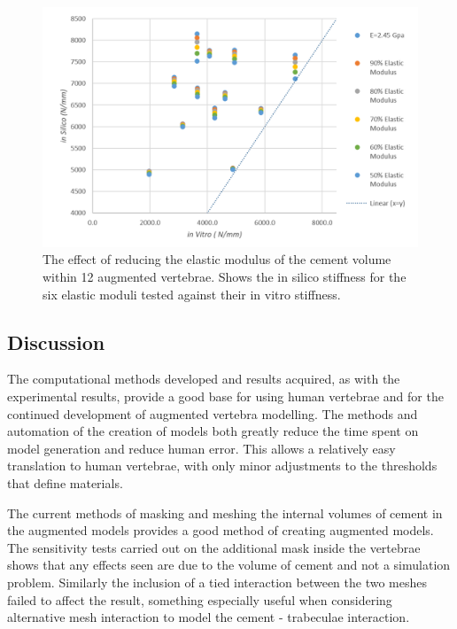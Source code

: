 \begin{figure}[ht!]
\centering
\includegraphics[width=5.3in]{images/reductionOfEMod_Scatter.png}
\caption{The effect of reducing the elastic modulus of the cement volume within 12 augmented vertebrae. Shows the in silico stiffness for the six elastic moduli tested against their in vitro stiffness. }
\label{fig:redEModscatter}
\end{figure}

\pagebreak

\subsection{Discussion}

The computational methods developed and results acquired, as with the experimental results, provide a good base for using human vertebrae and for the continued development of augmented vertebra modelling. The methods and automation of the creation of models both greatly reduce the time spent on model generation and reduce human error. This allows a relatively easy translation to human vertebrae, with only minor adjustments to the thresholds that define materials.

The current methods of masking and meshing the internal volumes of cement in the augmented models provides a good method of creating augmented models. The sensitivity tests carried out on the additional mask inside the vertebrae shows that any effects seen are due to the volume of cement and not a simulation problem. Similarly the inclusion of a tied interaction between the two meshes failed to affect the result, something especially useful when considering alternative mesh interaction to model the cement - trabeculae interaction.


